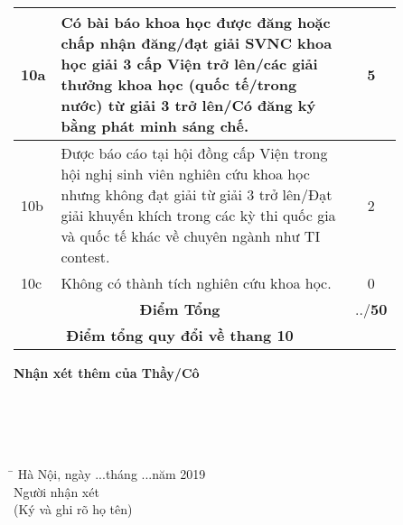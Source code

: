 \begin{longtable}{| m{0.035\linewidth} | m{0.7\linewidth} | m{0.02\linewidth} | m{0.02\linewidth}| m{0.02\linewidth}|  m{0.02\linewidth} | m{0.02\linewidth} |}
	10a & Có bài báo khoa học được đăng hoặc chấp nhận đăng/đạt giải SVNC khoa học giải 3 cấp Viện trở lên/các giải thưởng khoa học (quốc tế/trong nước) từ giải 3 trở lên/Có đăng ký bằng phát minh sáng chế. & \multicolumn{5}{c|}{5} \\ \hline
    10b & Được báo cáo tại hội đồng cấp Viện trong hội nghị sinh viên nghiên cứu khoa học nhưng không đạt giải từ giải 3 trở lên/Đạt giải khuyến khích trong các kỳ thi quốc gia và quốc tế khác về chuyên ngành như TI contest. & \multicolumn{5}{c|}{2} \\ \hline 
    10c & Không có thành tích nghiên cứu khoa học. & \multicolumn{5}{c|}{0} \\ \hline 
    \multicolumn{2}{|c|}{\textbf{Điểm Tổng}} & \multicolumn{5}{c|}{../\textbf{50}} \\ \hline
    \multicolumn{2}{|c|}{\textbf{Điểm tổng quy đổi về thang 10 }} & \multicolumn{5}{c|}{} \\ \hline
	\end{longtable}    
\thispagestyle{plain}

\noindent\textbf{Nhận xét thêm của Thầy/Cô} \\
\dotline[4pt]{\linewidth} \\
 \dotline[4pt]{\linewidth}\\
  \dotline[4pt]{\linewidth} \\
   \dotline[4pt]{\linewidth} \\
    \dotline[4pt]{\linewidth}
 
 \begin{tabbing}
 \hspace{9cm}\=\kill
   \> Hà Nội, ngày ...tháng ...năm 2019 \\ 
   \>  \hspace{1.5cm}    Người nhận xét\\ 
   \>   \hspace{1cm}  (Ký và ghi rõ họ tên)		
 \end{tabbing} 

